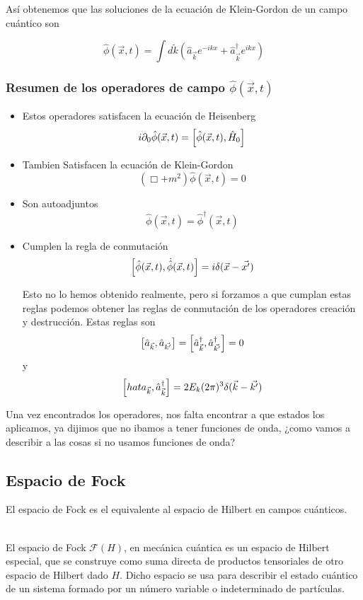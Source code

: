 Así obtenemos que las soluciones de la ecuación de Klein-Gordon de un campo cuántico son 

\[\hat{\phi}(\vec{x},t)=\int d \tilde{k} (\hat{a}_{\vec{k}}e^{-ikx}+\hat{a}^{\dagger}_{\vec{k}}e^{ikx})\]

\subsubsection{Resumen de los operadores de campo $\hat{\phi}(\vec{x},t)$}

\begin{itemize}
  \item Estos operadores satisfacen la ecuación de Heisenberg 
  \[i\partial_{0}\hat{\phi}(\vec{x},t)=\comm{\hat{\phi}(\vec{x},t)}{\hat{H}_{0}}\]
  \item Tambien Satisfacen la ecuación de Klein-Gordon
  \[(\Box +m^{2})\hat{\phi}(\vec{x},t)=0\]
  \item Son autoadjuntos 
  \[\hat{\phi}(\vec{x},t)=\hat{\phi}^{\dagger}(\vec{x},t)\]
  \item Cumplen la regla de conmutación
  \[\comm{\hat{\phi}(\vec{x},t)}{\dot{\hat{\phi}}(\vec{x},t)}=i\delta(\vec{x}-\vec{x'})\]
  
  Esto no lo hemos obtenido realmente, pero si forzamos a que cumplan estas reglas podemos obtener las reglas de conmutación de los operadores creación y destrucción. Estas reglas son
  \[\comm{\hat{a}_{\vec{k}}}{\hat{a}_{\vec{k'}}}=\comm{\hat{a}^{\dagger}_{\vec{k}}}{\hat{a}^{\dagger}_{\vec{k'}}}=0\]
  y \[\comm{hat{a}_{\vec{k}}}{\hat{a}^{\dagger}_{\vec{k}}}= 2E_{k}(2\pi)^{3}\delta(\vec{k}-\vec{k'})\]
\end{itemize}

Una vez encontrados los operadores, nos falta encontrar a que estados los aplicamos, ya dijimos que no ibamos a tener funciones de onda, ¿como vamos a describir a las cosas si no usamos funciones de onda?

\subsection{Espacio de Fock}

El espacio de Fock es el equivalente al espacio de Hilbert en campos cuánticos. 

\begin{definition} 
\\
  El espacio de Fock ${\mathcal {F}}(H)$, en mecánica cuántica es un espacio de Hilbert especial, que se construye como suma directa de productos tensoriales de otro espacio de Hilbert dado 
$H$. Dicho espacio se usa para describir el estado cuántico de un sistema formado por un número variable o indeterminado de partículas.
  
\end{definition}

